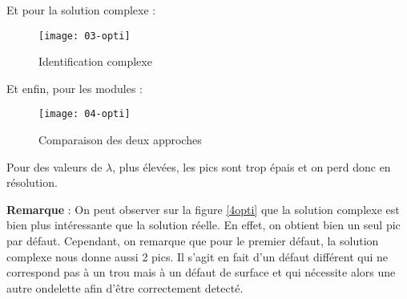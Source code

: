\documentclass[12pt,a4paper,titlepage]{scrartcl}
\begin{document}
Et pour la solution complexe :

\begin{figure}[H]
    \caption{Identification complexe}
    \texttt{[image: 03-opti]}
    \centering
\end{figure}

Et enfin, pour les modules :

\begin{figure}[H]
    \caption{Comparaison des deux approches}
    \label{fig:4opti}
    \texttt{[image: 04-opti]}
    \centering
\end{figure}

Pour des valeurs de $\lambda$, plus élevées, les pics sont trop épais
et on perd donc en résolution.

\textbf{Remarque} : On peut observer sur la figure \ref{4opti} que la solution complexe
est bien plus intéressante que la solution réelle. En effet, on obtient
bien un seul pic par défaut. Cependant, on remarque que pour le premier
défaut, la solution complexe nous donne aussi 2 pics. Il s'agit en fait d'un défaut
différent qui ne correspond pas à un trou mais à un défaut de surface et qui
nécessite alors une autre ondelette afin d'être correctement detecté.
\end{document}
